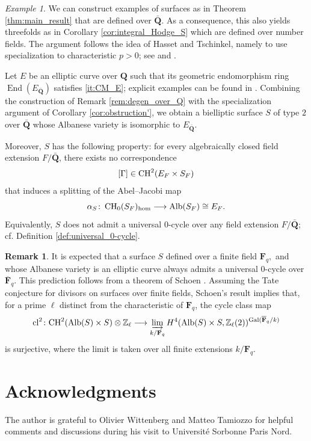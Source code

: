 \documentclass[11pt,letterpaper]{amsart}
\newcommand{\Alb}{\textnormal{Alb}}
\newcommand{\CH}{\textnormal{CH}}
\numberwithin{equation}{section}
\theoremstyle{definition}
\newtheorem{remark}[theorem]{Remark}
\theoremstyle{remark}
\newtheorem{example}[theorem]{Example}
\newcommand{\Z}{\mathbb{Z}}
\newcommand{\bbF}{\mathbf{F}}
\newcommand{\bbQ}{\mathbf{Q}}
\newcommand{\cl}{\text{cl}}
\newcommand{\Ch}{\operatorname{CH_{0}}}
\DeclareMathOperator{\Gal}{Gal}
\DeclareMathOperator{\End}{End}
\begin{document}
\begin{example}\label{ex:counterexample_Q}
We can construct examples of surfaces as in Theorem \ref{thm:main_result} that are defined over $\bar{\bbQ}$. As a consequence, this also yields threefolds as in Corollary \ref{cor:integral_Hodge_S} which are defined over number fields. 
The argument follows the idea of Hasset and Tschinkel, namely to use
specialization to characteristic $p>0$; see \cite[Remarque 5.9]{CTVoisin2012} and \cite{totaro2013integral}.

Let $E$ be an elliptic curve over $\bbQ$ such that its geometric endomorphism ring $\End(E_{\bar{\bbQ}})$ satisfies \ref{it:CM_E}; explicit examples can be found in \cite{lmfdb}. 
Combining the construction of Remark \ref{rem:degen_over_Q} with the specialization argument of Corollary \ref{cor:obstruction'}, we obtain a bielliptic surface $S$ of type $2$ over $\bar{\bbQ}$ whose Albanese variety is isomorphic to $E_{\bar{\bbQ}}$. 

Moreover, $S$ has the following property: for every algebraically closed field extension $F/\bar{\bbQ}$, there exists no correspondence
$$
[\Gamma] \in \CH^{2}(E_F \times S_F)
$$
that induces a splitting of the Abel--Jacobi map
$$
\alpha_S \colon \Ch(S_F)_{\hom} \longrightarrow \Alb(S_F) \cong E_F.
$$
Equivalently, $S$ does not admit a universal $0$-cycle over any field extension $F/\bar{\bbQ}$; cf. Definition \ref{def:universal_0-cycle}. 
\end{example}

\begin{remark}\label{rem:no_counterexample_F_p}
It is expected that a surface $S$ defined over a finite field $\bbF_q,$ and whose Albanese variety is an elliptic curve always admits a universal $0$-cycle over $\overline{\bbF}_q$. This prediction follows from a theorem of Schoen \cite[Theorem (0.5)]{Schoen1998}. Assuming the Tate conjecture for divisors on surfaces over finite fields, Schoen's result implies that, for a prime $\ell$ distinct from the characteristic of $\bbF_q$, the cycle class map
$$
\cl^{2}\colon \CH^{2}(\Alb(S)\times S)\otimes\Z_{\ell}
\longrightarrow 
\varinjlim_{k/\bbF_q} H^{4}(\Alb(S)\times S,\Z_{\ell}(2))^{\Gal(\overline{\bbF}_q/k)}
$$
is surjective, where the limit is taken over all finite extensions $k/\bbF_q$.
\end{remark}
\section*{Acknowledgments} The author is grateful to Olivier Wittenberg and Matteo Tamiozzo for helpful comments and discussions during his visit to Universit\'e Sorbonne Paris Nord. 
\printbibliography
\end{document}
